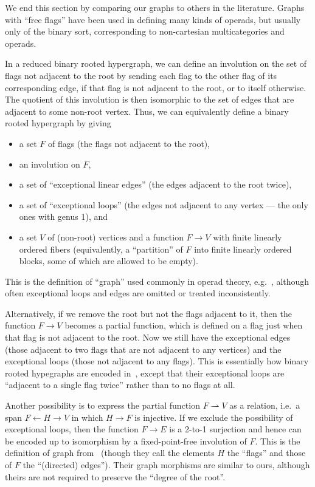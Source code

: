 \documentclass{article}
\theoremstyle{definition}
\theoremstyle{remark}
\let\ot\leftarrow
\begin{document}
We end this section by comparing our graphs to others in the literature.
Graphs with ``free flags'' have been used in defining many kinds of operads, but usually only of the binary sort, corresponding to non-cartesian multicategories and operads.

In a reduced binary rooted hypergraph, we can define an involution on the set of flags not adjacent to the root by sending each flag to the other flag of its corresponding edge, if that flag is not adjacent to the root, or to itself otherwise.
The quotient of this involution is then isomorphic to the set of edges that are adjacent to some non-root vertex.
Thus, we can equivalently define a binary rooted hypergraph by giving
\begin{itemize}
\item a set $F$ of flags (the flags not adjacent to the root),
\item an involution on $F$,
\item a set of ``exceptional linear edges'' (the edges adjacent to the root twice),
\item a set of ``exceptional loops'' (the edges not adjacent to any vertex --- the only ones with genus 1), and
\item a set $V$ of (non-root) vertices and a function $F\to V$ with finite linearly ordered fibers (equivalently, a ``partition'' of $F$ into finite linearly ordered blocks, some of which are allowed to be empty).
\end{itemize}
This is the definition of ``graph'' used commonly in operad theory, e.g.~\cite{bm:gen-opds,km:gwcqceg,costello:ainf,mms:wheeled-props,gk:modular-operads}, although often exceptional loops and edges are omitted or treated inconsistently.

Alternatively, if we remove the root but not the flags adjacent to it, then the function $F\to V$ becomes a partial function, which is defined on a flag just when that flag is not adjacent to the root.
Now we still have the exceptional edges (those adjacent to two flags that are not adjacent to any vertices) and the exceptional loops (those not adjacent to any flags).
This is essentially how binary rooted hypegraphs are encoded in~\cite{bb:htapm}, except that their exceptional loops are ``adjacent to a single flag twice'' rather than to no flags at all.

Another possibility is to express the partial function $F\rightharpoonup V$ as a relation, i.e.\ a span $F \ot H \to V$ in which $H\to F$ is injective.
If we exclude the possibility of exceptional loops, then the function $F\to E$ is a 2-to-1 surjection and hence can be encoded up to isomorphism by a fixed-point-free involution of $F$.
This is the definition of graph from~\cite{jk:feynman} (though they call the elements $H$ the ``flags'' and those of $F$ the ``(directed) edges'').
Their graph morphisms are similar to ours, although theirs are not required to preserve the ``degree of the root''.
\end{document}
